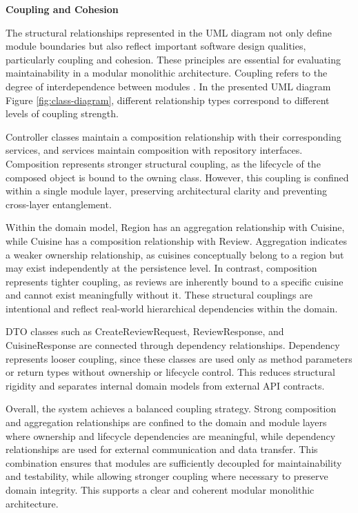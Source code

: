 \noindent \textbf{Coupling and Cohesion}

The structural relationships represented in the UML diagram not only define module boundaries but also reflect important software design qualities,
particularly coupling and cohesion.
These principles are essential for evaluating maintainability in a modular monolithic architecture.
Coupling refers to the degree of interdependence between modules \cite{GeeksforGeeks_2025}. 
In the presented UML diagram Figure \ref{fig:class-diagram}, different relationship types correspond 
to different levels of coupling strength.

Controller classes maintain a composition relationship with their 
corresponding services, 
and services maintain composition with repository interfaces. 
Composition represents stronger structural coupling, as the lifecycle 
of the composed object is bound to the owning class. 
However, this coupling is confined within a single module layer,
preserving architectural clarity and preventing cross-layer entanglement.

Within the domain model, Region has an aggregation relationship 
with Cuisine, while Cuisine has a composition relationship with Review. 
Aggregation indicates a weaker ownership relationship, 
as cuisines conceptually belong to a region but may exist independently 
at the persistence level. 
In contrast, composition represents tighter coupling, 
as reviews are inherently bound to a specific cuisine and cannot 
exist meaningfully without it. 
These structural couplings are intentional and reflect real-world 
hierarchical dependencies within the domain.

DTO classes such as CreateReviewRequest, ReviewResponse, 
and CuisineResponse are connected through dependency relationships. 
Dependency represents looser coupling, since these classes are used 
only as method parameters or return types without ownership or lifecycle control. 
This reduces structural rigidity and separates internal domain models from external API contracts.

Overall, the system achieves a balanced coupling strategy. 
Strong composition and aggregation relationships are confined to the domain and module layers where ownership and lifecycle dependencies are meaningful, 
while dependency relationships are used for external communication and data transfer. 
This combination ensures that modules are sufficiently decoupled for maintainability and testability, 
while allowing stronger coupling where necessary to preserve domain integrity. 
This supports a clear and coherent modular monolithic architecture.

